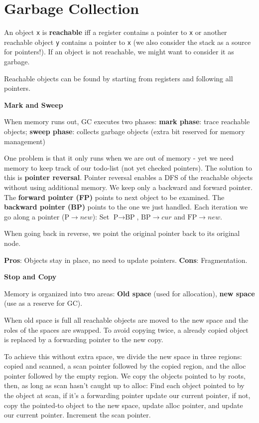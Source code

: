 \section*{Garbage Collection}

An object \texttt{x} is \textbf{reachable} iff a register contains a pointer to \texttt{x} or another reachable object \texttt{y} contains a pointer to \texttt{x} (we also consider the stack as a source for pointers!). If an object is not reachable, we might want to consider it as garbage. \medskip

Reachable objects can be found by starting from registers and following all pointers. \medskip

\textbf{Mark and Sweep} \smallskip

When memory runs out, GC executes two phases: \textbf{mark phase}: trace reachable objects; \textbf{sweep phase}: collects garbage objects (extra bit reserved for memory management)\medskip

One problem is that it only runs when we are out of memory - yet we need memory
to keep track of our todo-list (not yet checked pointers). The solution to this
is \textbf{pointer reversal}. Pointer reversal enables a DFS
of the reachable objects without using additional memory. We keep only a
backward and forward pointer. The \textbf{forward pointer (FP)} points to next object to
be examined. The \textbf{backward pointer (BP)} points to the
one we just handled.
Each iteration we go along a pointer ($\text{P} \to new$): Set $\text{P} \to \text{BP}$,
$\text{BP} \to cur$ and $\text{FP} \to new$.

When going back in reverse, we point the original pointer back to its original node.
\medskip

\textbf{Pros}: Objects stay in place, no need to update pointers. \textbf{Cons}: Fragmentation.\medskip

\textbf{Stop and Copy} \smallskip

Memory is organized into two areas: \textbf{Old space} (used for allocation), \textbf{new space} (use as a reserve for GC). \medskip

When old space is full all reachable objects are moved to the new space and the roles of the spaces are swapped. To avoid copying twice, a already copied object is replaced by a forwarding pointer to the new copy. \medskip

To achieve this without extra space, we divide the new space in three regions: copied and scanned, a scan pointer followed by the copied region, and the alloc pointer followed by the empty region. We copy the objects pointed to by roots, then, as long as scan hasn't caught up to alloc: Find each object pointed to by the object at scan, if it's a forwarding pointer update our current pointer, if not, copy the pointed-to object to the new space, update alloc pointer, and update our current pointer. Increment the scan pointer. \medskip

